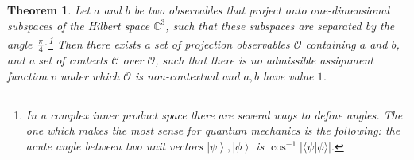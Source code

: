 \documentclass[11pt, a4paper]{article}
\newtheorem{Theorem}{Theorem}
\theoremstyle{definition}
\newcommand{\ket}[1]{\left| #1 \right>}
\newcommand{\iprod}[2]{\langle #1 | #2 \rangle}
\begin{document}
\begin{Theorem}
\label{thm:twonotvaluedefinite}
	Let $a$ and $b$ be two observables that project onto one-dimensional subspaces of the Hilbert space $\mathbb{C}^3$, such that these subspaces are separated by the angle $\frac{\pi}{4}\raisebox{.8mm}{.}$\footnote{In a complex inner product space there are several ways to define angles. The one which makes the most sense for quantum mechanics is the following: the acute angle between two unit vectors $\ket{\psi}, \ket{\phi}$ is $\cos^{-1}|\iprod{\psi}{\phi}|.$} Then there exists a set of projection observables $\mathcal{O}$ containing $a$ and $b$, and a set of contexts $\mathcal{C}$ over $\mathcal{O}$, such that there is no admissible assignment function $v$ under which $\mathcal{O}$ is non-contextual and $a, b$ have value $1$.
\end{Theorem}
\end{document}
